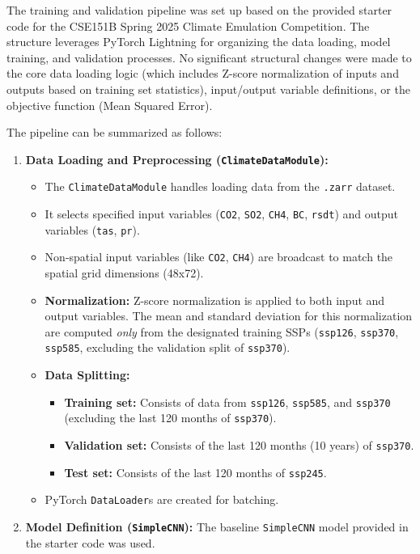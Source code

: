 \documentclass{article}
\begin{document}
The training and validation pipeline was set up based on the provided starter code for the CSE151B Spring 2025 Climate Emulation Competition. The structure leverages PyTorch Lightning for organizing the data loading, model training, and validation processes. No significant structural changes were made to the core data loading logic (which includes Z-score normalization of inputs and outputs based on training set statistics), input/output variable definitions, or the objective function (Mean Squared Error).

The pipeline can be summarized as follows:
\begin{enumerate}
    \item \textbf{Data Loading and Preprocessing (\texttt{ClimateDataModule}):}
    \begin{itemize}
        \item The \texttt{ClimateDataModule} handles loading data from the \texttt{.zarr} dataset.
        \item It selects specified input variables (\texttt{CO2}, \texttt{SO2}, \texttt{CH4}, \texttt{BC}, \texttt{rsdt}) and output variables (\texttt{tas}, \texttt{pr}).
        \item Non-spatial input variables (like \texttt{CO2}, \texttt{CH4}) are broadcast to match the spatial grid dimensions (48x72).
        \item \textbf{Normalization:} Z-score normalization is applied to both input and output variables. The mean and standard deviation for this normalization are computed \emph{only} from the designated training SSPs (\texttt{ssp126}, \texttt{ssp370}, \texttt{ssp585}, excluding the validation split of \texttt{ssp370}).
        \item \textbf{Data Splitting:}
        \begin{itemize}
            \item \textbf{Training set:} Consists of data from \texttt{ssp126}, \texttt{ssp585}, and \texttt{ssp370} (excluding the last 120 months of \texttt{ssp370}).
            \item \textbf{Validation set:} Consists of the last 120 months (10 years) of \texttt{ssp370}.
            \item \textbf{Test set:} Consists of the last 120 months of \texttt{ssp245}.
        \end{itemize}
        \item PyTorch \texttt{DataLoader}s are created for batching.
    \end{itemize}
    \item \textbf{Model Definition (\texttt{SimpleCNN}):} The baseline \texttt{SimpleCNN} model provided in the starter code was used.

\end{enumerate}
\end{document}
